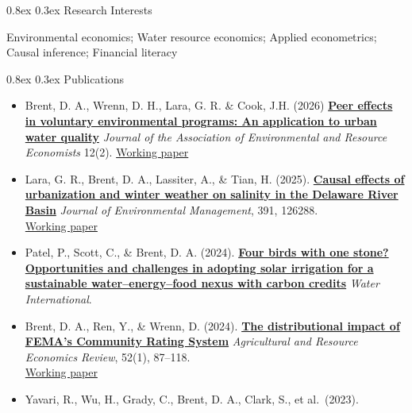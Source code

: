 \documentclass[
  11pt,
]{article}
\makeatletter
\renewcommand\subsection{
  \@startsection{subsection}{2}{0pt}
  {0.8ex}
  {0.3ex}
  {\sffamily\bfseries\large}
}
\makeatother
\begin{document}
\subsection{Research Interests}\label{research-interests}

Environmental economics; Water resource economics; Applied econometrics;
Causal inference; Financial literacy

\subsection{Publications}\label{publications}

\begin{itemize}
\item
  Brent, D. A., Wrenn, D. H., Lara, G. R. \& Cook, J.H. (2026)
  \textbf{\href{https://www.journals.uchicago.edu/doi/full/10.1086/739114}{Peer
  effects in voluntary environmental programs: An application to urban
  water quality}} \emph{Journal of the Association of Environmental and
  Resource Economists} 12(2).
  \href{assets/papers/brent_et_al_peer_effects_gsi.pdf}{Working paper}
\item
  Lara, G. R., Brent, D. A., Lassiter, A., \& Tian, H. (2025).
  \textbf{\href{https://www.sciencedirect.com/science/article/pii/S0301479725022649}{Causal
  effects of urbanization and winter weather on salinity in the Delaware
  River Basin}} \emph{Journal of Environmental Management}, 391,
  126288.\\
  \href{assets/papers/lara_brent_salinity_wp.pdf}{Working paper}
\item
  Patel, P., Scott, C., \& Brent, D. A. (2024).
  \textbf{\href{https://www.tandfonline.com/doi/full/10.1080/02508060.2024.2345494}{Four
  birds with one stone? Opportunities and challenges in adopting solar
  irrigation for a sustainable water--energy--food nexus with carbon
  credits}} \emph{Water International}.
\item
  Brent, D. A., Ren, Y., \& Wrenn, D. (2024).
  \textbf{\href{https://www.cambridge.org/core/journals/agricultural-and-resource-economics-review/article/distributional-impact-of-femas-community-rating-system/0AFC86047D78C25F23452B29823F30F4}{The
  distributional impact of FEMA's Community Rating System}}
  \emph{Agricultural and Resource Economics Review}, 52(1), 87--118.\\
  \href{https://papers.ssrn.com/sol3/papers.cfm?abstract_id=4163230}{Working
  paper}
\item
  Yavari, R., Wu, H., Grady, C., Brent, D. A., Clark, S., et al.~(2023).

\end{itemize}
\end{document}
